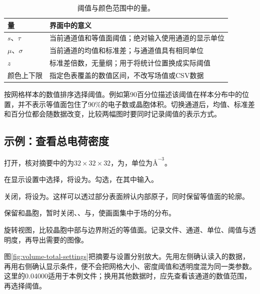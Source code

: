 \begin{table}[htbp]
\centering
\caption{阈值与颜色范围中的量。}
\begin{tabularx}{\linewidth}{lX}
\toprule
量 & 界面中的意义\\
\midrule
$s$、$\tau$ & 当前通道值和等值面阈值；绝对输入使用通道的显示单位\\
$\mu$、$\sigma$ & 当前通道的均值和标准差；与通道值具有相同单位\\
$z$ & 标准差倍数，无量纲；用于将统计位置换成实际阈值\\
颜色上下限 & 指定色表覆盖的数值区间，不改写场值或CSV数据\\
\bottomrule
\end{tabularx}
\end{table}

按网格样本的数值排序选择阈值。例如第90百分位描述该阈值在样本分布中的位置，并不表示等值面包住了90\%的电子数或晶胞体积。切换通道后，均值、标准差和百分位都会随数据改变，比较两幅图时要同时记录阈值的表示方式。

\subsection{示例：查看总电荷密度}

\begin{steps}
  \item 打开，核对摘要中的为$32\times32\times32$，为，单位为$\text{\AA}^{-3}$。
  \item 在显示设置中选择，将设为。勾选，在其中输入。
  \item 关闭，将设为。这样可以透过部分表面辨认内部原子，同时保留等值面的轮廓。
  \item 保留和晶胞，暂时关闭、、与，使画面集中于场的分布。
  \item 旋转视图，比较晶胞中部与边界附近的等值面。记录文件、通道、单位、阈值与透明度，再导出需要的图像。
\end{steps}

图\ref{fig:volume-total-settings}把摘要与设置分别放大。先用左侧确认读入的数据，再用右侧确认显示条件，便不会把网格大小、密度阈值和透明度混为同一类参数。这里的0.04000适用于本例文件；换用其他数据时，应先查看该通道的数值范围，再选择阈值。

